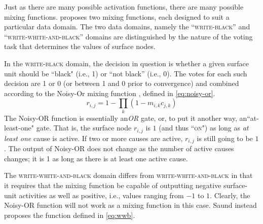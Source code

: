 Just as there are many possible activation functions, there are many 
possible mixing functions.
\citet{saund:94} proposes two mixing functions, each designed 
to suit a particular data domain.  The two data domains, namely 
the ``\textsc{write-black}'' and ``\textsc{write-white-and-black}'' 
domains are distinguished by the nature of the voting task that 
determines the values of surface nodes. 

 In the \textsc{write-black} domain, the decision in question is 
 whether a given surface unit should be ``black" (i.e., 1) or ``not black'' (i.e., 0). 
 The votes for each such decision are 1 or 0 (or between 1 and 0 prior to convergence) 
 and combined according to the  Noisy-Or mixing function \citep{pearl:1988}, 
 defined in \eqref{eq:noisy-or}.
\begin{equation}\label{eq:noisy-or}
r_{i,j} = 1 - \prod\limits_{k} (1 - m_{i,k} c_{j,k})
\end{equation}
 The Noisy-OR function is essentially an\textit{OR} gate, or, to put it another way, 
 an``at-least-one" gate. That is, the surface node $r_{i,j}$ is $1$ (and thus ``\textsc{on}") as long as 
 \emph{at least one} cause is active.
 If two or more causes are active,
$r_{i,j}$ is still going to be $1$. The output of Noisy-OR does not change 
as the number of active causes changes; it is 1 as long as there is at least one active cause.

The \textsc{write-white-and-black} domain differs from \textsc{write-white-and-black} 
in that it requires that the mixing function be capable of outputting negative surface-unit 
activities as well as positive, i.e., values ranging from $-1$ to $1$.
Clearly, the Noisy-OR function will not work as a mixing function
 in this case. Saund instead proposes the function defined in \eqref{eq:wwb}. 

